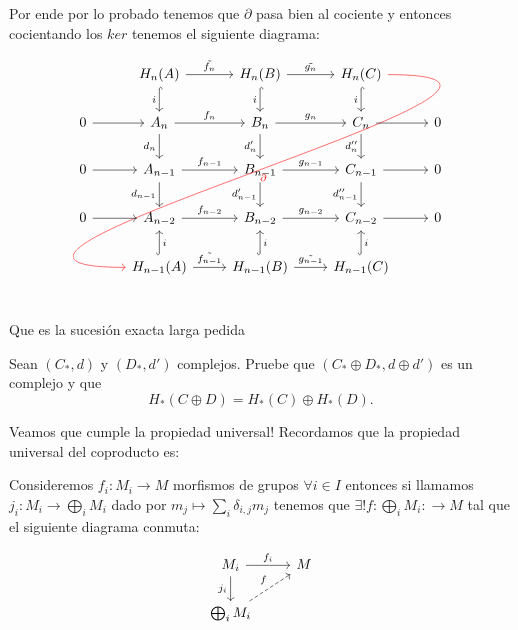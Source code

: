 \documentclass[11pt,a4paper,oneside]{article}
\newenvironment{proof}[1][Demostraci\'on]{\begin{trivlist}
\item[\hskip \labelsep {\bfseries #1}]}{\end{trivlist}}
\newenvironment{remark}[1][Observaci\'on]{\begin{trivlist}
\item[\hskip \labelsep {\bfseries #1}]}{\end{trivlist}}
\newcommand{\qed}{\nobreak \ifvmode \relax \else
      \ifdim\lastskip<1.5em \hskip-\lastskip
      \hskip1.5em plus0em minus0.5em \fi \nobreak
      \vrule height0.75em width0.5em depth0.25em\fi}
\begin{document}
\begin{enumerate}
\begin{proof}
\begin{itemize}
\end{itemize}

Por ende por lo probado tenemos que $\partial$ pasa bien al cociente y entonces cocientando los $ker$ tenemos el siguiente diagrama:


\[
\begin{tikzcd}
& H_n(A) \arrow[swap,hook]{d}{i} \arrow{r}{\tilde{f_n}} & H_n(B) \arrow[swap,hook]{d}{i} \arrow{r}{\tilde{g_n}} & H_n(C) \arrow[swap,hook]{d}{i} \arrow[out=0, in=180, looseness=2, overlay, red]{ddddll}{\partial} & \\
0 \rar & A_n \arrow[swap]{d}{d_n} \arrow{r}{f_n} & B_n \arrow[swap]{d}{d'_n} \arrow{r}{g_n} & C_n \arrow[swap]{d}{d''_n} \rar & 0 \\
0 \rar & A_{n-1} \arrow{r}{f_{n-1}} \arrow[swap]{d}{d_{n-1}} & B_{n-1} \arrow{r}{g_{n-1}} \arrow[swap]{d}{d'_{n-1}} & C_{n-1} \rar \arrow[swap]{d}{d''_{n-1}} & 0 \\
0 \rar & A_{n-2} \arrow{r}{f_{n-2}} & B_{n-2} \arrow{r}{g_{n-2}}& C_{n-2} \rar & 0 \\
& H_{n-1}(A) \arrow[swap,hook]{u}{i} \arrow{r}{\tilde{f_{n-1}}} & H_{n-1}(B) \arrow[swap,hook]{u}{i} \arrow{r}{\tilde{g_{n-1}}} & H_{n-1}(C) \arrow[swap,hook]{u}{i} & \\
\end{tikzcd}
\]

Que es la sucesi\'on exacta larga pedida \qed

\end{proof}

\item
Sean $(C_*,d)$ y $(D_*,d')$ complejos. Pruebe que $(C_*\oplus
D_*,d\oplus d')$ es un complejo y que $$H_*(C\oplus D)=H_*(C)\oplus
H_*(D).$$

\begin{proof}
Veamos que cumple la propiedad universal! Recordamos que la propiedad universal del coproducto es:

\begin{remark}
Consideremos $f_i : M_i \rightarrow M$ morfismos de grupos $\forall i \in I$ entonces si llamamos $j_i : M_i \rightarrow \bigoplus_{i}{M_i}$ dado por $m_j \mapsto \sum_{i} \delta_{i,j}m_j$ tenemos que $\exists! f: \bigoplus_{i}{M_i}:\rightarrow M$ tal que el siguiente diagrama conmuta:

\[
\begin{tikzcd}
M_i \arrow{r}{f_i} \arrow[swap]{d}{j_i} & M \\
\bigoplus_{i}{M_i} \arrow[dashed]{ur}{f} \\
\end{tikzcd}
\]


\end{remark}
\end{proof}
\end{enumerate}
\end{document}
